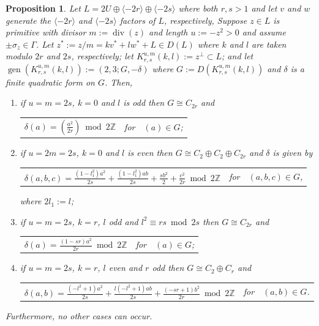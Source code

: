 \documentclass[12pt, a4paper]{article}
\newtheorem{proposition}[thm]{Proposition}
\newcommand{\ZZ}{\mathbb{Z}}
\newcommand{\la}{\langle}
\newcommand{\ra}{\rangle}
\newcommand{\opn}{\operatorname}
\newcommand{\op}{\oplus}
\begin{document}
\begin{proposition}\label{KgenusProp}
  Let $L=2U \op \la -2r \ra \op \la -2s \ra$ where both $r, s > 1$ and let $v$ and $w$ generate the $\la -2r \ra$ and $\la -2s \ra$ factors of $L$, respectively,
  Suppose $z \in L$ is primitive with divisor $m:=\opn{div}(z)$ and length $u:=-z^2>0$ and assume $\pm \sigma_z \in \Gamma$.
  Let  $z^* := z/m   = k v^*+ l w^* + L \in D(L)$ where $k$ and $l$ are taken modulo $2r$ and $2s$, respectively;
  let $K^{u, m}_{r,s}(k,l) := z^{\perp} \subset L$;
  and let $\opn{gen}(K^{u,m}_{r,s}(k,l)):=(2,3; G, -\delta)$ where $G := D(K^{u,m}_{r,s}(k,l))$ and $\delta$ is a finite quadratic form on $G$.
  Then,
  \begin{enumerate}
  \item if $u=m=2s$, $k=0$ and $l$ is odd then $G \cong C_{2r}$ and 
    \begin{center}
      \begin{tabular}{c c c}
        $\delta(a) = \left ( \frac{a^2}{2r} \right ) \bmod{ 2 \ZZ}$
        & for &
        $(a) \in G$; 
      \end{tabular}
    \end{center}
  \item if $u=2m=2s$, $k=0$ and $l$ is even then $G \cong C_2 \op C_2 \op C_{2r}$ and $\delta$ is given by
    \begin{center}
      \begin{tabular}{ c c c}
        $\delta(a,b,c) =
        \frac{(1-l_1^2)a^2}{2s}
        +\frac{(1-l_1^2)ab}{2s}
        +\frac{sb^2}{2}
        + \frac{c^2}{2r}
        \bmod{ 2\ZZ}$
        & for &
        $(a,b,c) \in G$,
      \end{tabular}
    \end{center}
    where $2l_1:=l$;
  \item if $u=m=2s$, $k=r$, $l$ odd and $l^2  \equiv rs \bmod{ 2s}$ then $G \cong C_{2r}$ and 
    \begin{center}
      \begin{tabular}{c c c}
        $\delta(a) = \frac{(1 - sr)a^2}{2r} \bmod{ 2\ZZ}$
        & for &
        $ (a) \in G$;
      \end{tabular}
    \end{center}
  \item if $u=m=2s$, $k=r$, $l$ even and $r$ odd then $G \cong C_2 \op C_r$ and 
    \begin{center}
      \begin{tabular}{c c c}
        $\delta(a,b) =
        \frac{ (-l^2 + 1)a^2}{2s}
        +
        \frac{ l(-l^2 + 1)ab}{2s}
        +
        \frac{(-sr + 1)b^2}{2r}
        \bmod{ 2\ZZ}$
        & for &
        $(a,b) \in G$.
      \end{tabular}
    \end{center}
  \end{enumerate}
  Furthermore, no other cases can occur.
\end{proposition}
\end{document}
